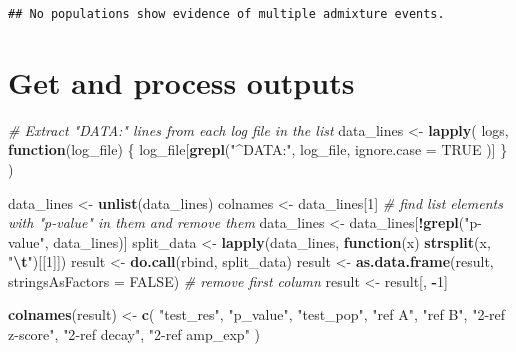 \documentclass[
]{article}
\newenvironment{Shaded}{\begin{snugshade}}{\end{snugshade}}
\newcommand{\AttributeTok}[1]{\textcolor[rgb]{0.13,0.29,0.53}{#1}}
\newcommand{\CommentTok}[1]{\textcolor[rgb]{0.56,0.35,0.01}{\textit{#1}}}
\newcommand{\ConstantTok}[1]{\textcolor[rgb]{0.56,0.35,0.01}{#1}}
\newcommand{\ControlFlowTok}[1]{\textcolor[rgb]{0.13,0.29,0.53}{\textbf{#1}}}
\newcommand{\DecValTok}[1]{\textcolor[rgb]{0.00,0.00,0.81}{#1}}
\newcommand{\FunctionTok}[1]{\textcolor[rgb]{0.13,0.29,0.53}{\textbf{#1}}}
\newcommand{\NormalTok}[1]{#1}
\newcommand{\OtherTok}[1]{\textcolor[rgb]{0.56,0.35,0.01}{#1}}
\newcommand{\SpecialCharTok}[1]{\textcolor[rgb]{0.81,0.36,0.00}{\textbf{#1}}}
\newcommand{\StringTok}[1]{\textcolor[rgb]{0.31,0.60,0.02}{#1}}
\begin{document}
\begin{verbatim}
## No populations show evidence of multiple admixture events.
\end{verbatim}

\section{Get and process outputs}\label{get-and-process-outputs}

\begin{Shaded}
\begin{Highlighting}[]
\CommentTok{\# Extract "DATA:" lines from each log file in the list}
\NormalTok{data\_lines }\OtherTok{\textless{}{-}} \FunctionTok{lapply}\NormalTok{(}
\NormalTok{  logs,}
  \ControlFlowTok{function}\NormalTok{(log\_file) \{}
\NormalTok{    log\_file[}\FunctionTok{grepl}\NormalTok{(}\StringTok{"\^{}DATA:"}\NormalTok{,}
\NormalTok{      log\_file,}
      \AttributeTok{ignore.case =} \ConstantTok{TRUE}
\NormalTok{    )]}
\NormalTok{  \}}
\NormalTok{)}

\NormalTok{data\_lines }\OtherTok{\textless{}{-}} \FunctionTok{unlist}\NormalTok{(data\_lines)}
\NormalTok{colnames }\OtherTok{\textless{}{-}}\NormalTok{ data\_lines[}\DecValTok{1}\NormalTok{]}
\CommentTok{\# find list elements with "p{-}value" in them and remove them}
\NormalTok{data\_lines }\OtherTok{\textless{}{-}}\NormalTok{ data\_lines[}\SpecialCharTok{!}\FunctionTok{grepl}\NormalTok{(}\StringTok{"p{-}value"}\NormalTok{, data\_lines)]}
\NormalTok{split\_data }\OtherTok{\textless{}{-}} \FunctionTok{lapply}\NormalTok{(data\_lines, }\ControlFlowTok{function}\NormalTok{(x) }\FunctionTok{strsplit}\NormalTok{(x, }\StringTok{"}\SpecialCharTok{\textbackslash{}t}\StringTok{"}\NormalTok{)[[}\DecValTok{1}\NormalTok{]])}
\NormalTok{result }\OtherTok{\textless{}{-}} \FunctionTok{do.call}\NormalTok{(rbind, split\_data)}
\NormalTok{result }\OtherTok{\textless{}{-}} \FunctionTok{as.data.frame}\NormalTok{(result, }\AttributeTok{stringsAsFactors =} \ConstantTok{FALSE}\NormalTok{)}
\CommentTok{\# remove first column}
\NormalTok{result }\OtherTok{\textless{}{-}}\NormalTok{ result[, }\SpecialCharTok{{-}}\DecValTok{1}\NormalTok{]}

\FunctionTok{colnames}\NormalTok{(result) }\OtherTok{\textless{}{-}} \FunctionTok{c}\NormalTok{(}
  \StringTok{"test\_res"}\NormalTok{, }\StringTok{"p\_value"}\NormalTok{, }\StringTok{"test\_pop"}\NormalTok{,}
  \StringTok{"ref A"}\NormalTok{, }\StringTok{"ref B"}\NormalTok{, }\StringTok{"2{-}ref z{-}score"}\NormalTok{,}
  \StringTok{"2{-}ref decay"}\NormalTok{, }\StringTok{"2{-}ref amp\_exp"}
\NormalTok{)}


\end{Highlighting}
\end{Shaded}
\end{document}
